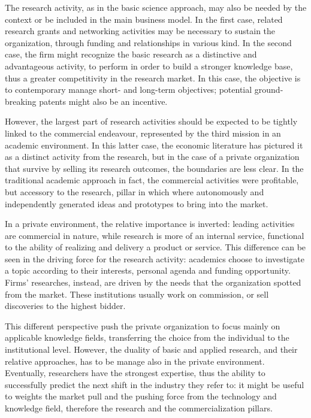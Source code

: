 The research activity, as in the basic science approach, may also be needed by the context or be included in the main business model. In the first case, related research grants and networking activities may be necessary to sustain the organization, through funding and relationships in various kind. In the second case, the firm might recognize the basic research as a distinctive and advantageous activity, to perform in order to build a stronger knowledge base, thus a greater competitivity in the research market. In this case, the objective is to contemporary manage short- and long-term objectives; potential ground-breaking patents might also be an incentive.

However, the largest part of research activities should be expected to be tightly linked to the commercial endeavour, represented by the third mission in an academic environment. In this latter case, the economic literature has pictured it as a distinct activity from the research, but in the case of a private organization that survive by selling its research outcomes, the boundaries are less clear. In the traditional academic approach in fact, the commercial activities were profitable, but accessory to the research, pillar in which where autonomously and independently generated ideas and prototypes to bring into the market. 

In a private environment, the relative importance is inverted: leading activities are commercial in nature, while research is more of an internal service, functional to the ability of realizing and delivery a product or service. This difference can be seen in the driving force for the research activity: academics choose to investigate a topic according to their interests, personal agenda and funding opportunity. Firms' researches, instead, are driven by the needs that the organization spotted from the market. These institutions usually work on commission, or sell discoveries to the highest bidder. 

This different perspective push the private organization to focus mainly on applicable knowledge fields, transferring the choice from the individual to the institutional level. However, the duality of basic and applied research, and their relative approaches, has to be manage also in the private environment. Eventually, researchers have the strongest expertise, thus the ability to successfully predict the next shift in the industry they refer to: it might be useful to weights the market pull and the pushing force from the technology and knowledge field, therefore the research and the commercialization pillars. 

